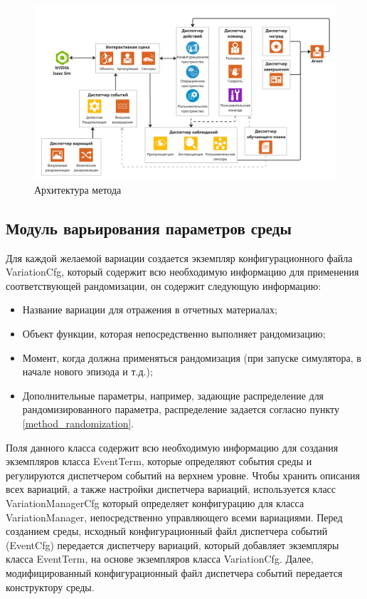         \begin{figure}
            \begin{center}
                \includegraphics[width=1.0\textwidth]{images/Project Architecture.jpg}
            \caption{Архитектура метода}
            \label{fig:arch}
            \end{center}
        \end{figure}

        \subsection{Модуль варьирования параметров среды}
            Для каждой желаемой вариации создается экземпляр конфигурационного файла VariationCfg, который содержит всю необходимую информацию для применения соответствующей рандомизации, он содержит следующую информацию:

            \begin{itemize}
                \item Название вариации для отражения в отчетных материалах;
                \item Объект функции, которая непосредственно выполняет рандомизацию;
                \item Момент, когда должна применяться рандомизация (при запуске симулятора, в начале нового эпизода и т.д.);
                \item Дополнительные параметры, например, задающие распределение для рандомизированного параметра, распределение задается согласно пункту \ref{method_randomization}.
            \end{itemize} 

            Поля данного класса содержит всю необходимую информацию для создания экземпляров класса EventTerm, которые определяют события среды и регулируются диспетчером событий на верхнем уровне.  
            Чтобы хранить описания всех вариаций, а также настройки диспетчера вариаций, используется класс VariationManagerCfg который определяет конфигурацию для класса VariationManager, непосредственно управляющего всеми вариациями. Перед созданием среды, исходный конфигурационный файл диспетчера событий (EventCfg) передается диспетчеру вариаций, который добавляет экземпляры класса EventTerm, на основе экземпляров класса VariationCfg. Далее, модифицированный конфигурационный файл диспетчера событий передается конструктору среды.


